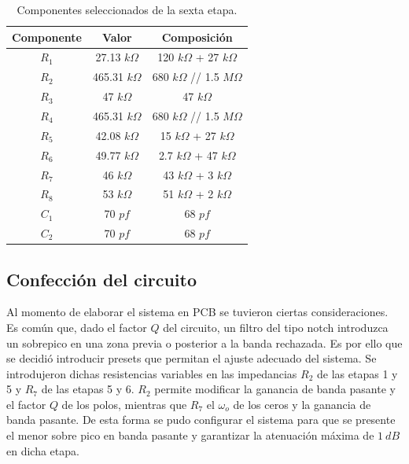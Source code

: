 \begin{multicols}{2}
\begin{table}[H]
\centering
\begin{tabular}{ccc}
\hline
\multicolumn{1}{c}{Componente} & \multicolumn{1}{c}{Valor} & Composición \\ \hline
$R_1$                           & 27.13 $k\Omega$                      & 120 $k\Omega$ + 27 $k\Omega$     \\
$R_2$                           & 465.31 $k\Omega$                    & 680 $k\Omega$ // 1.5 $M\Omega$  \\
$R_3$                           & 47 $k\Omega$                        & 47 $k\Omega$         \\
$R_4$                           & 465.31 $k\Omega$                    & 680 $k\Omega$ // 1.5 $M\Omega$  \\
$R_5$                           & 42.08 $k\Omega$                     & 15 $k\Omega$ + 27 $k\Omega$     \\
$R_6$                           & 49.77 $k\Omega$                     & 2.7 $k\Omega$ + 47 $k\Omega$    \\
$R_7$                           & 46 $k\Omega$                        & 43 $k\Omega$ + 3 $k\Omega$         \\
$R_8$                           & 53 $k\Omega$                        & 51 $k\Omega$ + 2 $k\Omega$         \\
$C_1$                           & 70 $pf$                       & 68 $pf$        \\
$C_2$                           & 70 $pf$                       & 68 $pf$  \\
\hline
\end{tabular}
\caption{Componentes seleccionados de la sexta etapa.}
\end{table}
\end{multicols}

\subsection{Confección del circuito}
Al momento de elaborar el sistema en PCB se tuvieron ciertas consideraciones. Es común que, dado el factor $Q$ del circuito, un filtro del tipo notch introduzca un sobrepico en una zona previa o posterior a la banda rechazada. Es por ello que se decidió introducir presets que permitan el ajuste adecuado del sistema. Se introdujeron dichas resistencias variables en las impedancias $R_2$ de las etapas 1 y 5 y $R_7$ de las etapas 5 y 6. $R_2$ permite modificar la ganancia de banda pasante y el factor $Q$ de los polos, mientras que $R_7$ el $\omega_o$ de los ceros y la ganancia de banda pasante. De esta forma se pudo configurar el sistema para que se presente el menor sobre pico en banda pasante y garantizar la atenuación máxima de $1 \ dB$ en dicha etapa.

